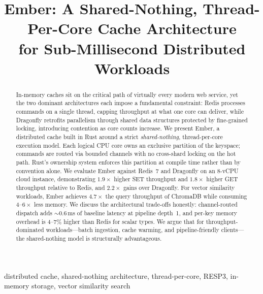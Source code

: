 \documentclass[conference]{IEEEtran}
\begin{document}
\title{Ember: A Shared-Nothing, Thread-Per-Core Cache Architecture\\for Sub-Millisecond Distributed Workloads}

\author{
}

\maketitle

\begin{abstract}
In-memory caches sit on the critical path of virtually every modern web
service, yet the two dominant architectures each impose a fundamental
constraint: Redis processes commands on a single thread, capping
throughput at what one core can deliver, while Dragonfly retrofits
parallelism through shared data structures protected by fine-grained
locking, introducing contention as core counts increase. We present
Ember, a distributed cache built in Rust around a strict
\emph{shared-nothing}, thread-per-core execution model. Each logical CPU
core owns an exclusive partition of the keyspace; commands are routed via
bounded channels with no cross-shard locking on the hot path. Rust's
ownership system enforces this partition at compile time rather than by
convention alone. We evaluate Ember against Redis~7 and Dragonfly on an
8-vCPU cloud instance, demonstrating $1.9\times$ higher SET throughput
and $1.8\times$ higher GET throughput relative to Redis, and
$2.2\times$ gains over Dragonfly. For vector similarity workloads,
Ember achieves $4.7\times$ the query throughput of ChromaDB while
consuming $4$--$6\times$ less memory. We discuss the architectural
trade-offs honestly: channel-routed dispatch adds ${\sim}0.6$\,ms of
baseline latency at pipeline depth~1, and per-key memory overhead is
4--7\% higher than Redis for scalar types. We argue that for
throughput-dominated workloads---batch ingestion, cache warming, and
pipeline-friendly clients---the shared-nothing model is structurally
advantageous.
\end{abstract}

\begin{IEEEkeywords}
distributed cache, shared-nothing architecture, thread-per-core, RESP3,
in-memory storage, vector similarity search
\end{IEEEkeywords}
\end{document}
